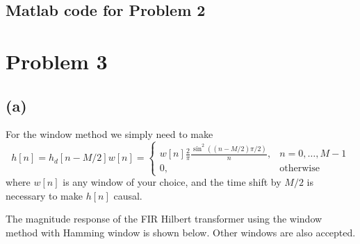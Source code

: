 \documentclass{article}
\begin{document}
\subsection{Matlab code for Problem 2}


\newpage
\section{Problem 3}
\subsection{(a)}

For the window method we simply need to make
\begin{equation}
	h[n] = h_d[n-M/2]w[n] = \begin{cases}
	w[n]\frac{2}{\pi}\frac{\sin^2((n-M/2)\pi/2)}{n}, & n = 0, \ldots, M-1 \\
	0, & \text{otherwise}
	\end{cases} 
\end{equation}
where $w[n]$ is any window of your choice, and the time shift by $M/2$ is necessary to make $h[n]$ causal.

The magnitude response of the FIR Hilbert transformer using the window method with Hamming window is shown below. Other windows are also accepted.
\end{document}
